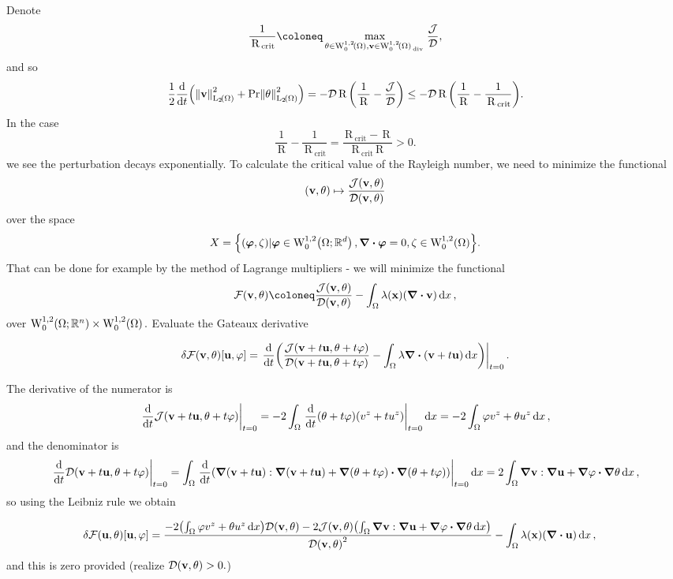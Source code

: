 \documentclass[../main.tex]{subfiles}
\begin{document}
Denote
\[
	\frac{1}{\, \text{R} \,_{\text{crit}}} \coloneq \max_{\theta \in \WkpzeroSet[1][2]{\Omega}, \vb{v} \in \WkpzeroSet[1][2]{\Omega}_{\, \text{div} \,}} \frac{\mathcal{J}}{\mathcal{D}},
\]
and so
\[
	\frac{1}{2}\dv{t}\qty(\norm{\vb{v}}_{\LpSet[2]{\Omega}}^{2} + \Prandtl \norm{\theta}_{\LpSet[2]{\Omega}}^{2}) = - \mathcal{D} \, \text{R} \,\qty(\frac{1}{\, \text{R} \,} - \frac{\mathcal{J}}{\mathcal{D}}) \leq - \mathcal{D} \, \text{R} \,\qty(\frac{1}{\, \text{R} \,}-\frac{1}{\, \text{R} \,_{\text{crit}}}).
\]
In the case
\[
	\frac{1}{\, \text{R} \,}- \frac{1}{\, \text{R} \,_{\text{crit}}} = \frac{\, \text{R} \,_{\text{crit}} - \, \text{R} \,}{\, \text{R} \,_{\text{crit}} \, \text{R} \,} >0.
\]
we see the perturbation decays exponentially.
To calculate the critical value of the Rayleigh number, we need to minimize the functional
\[
	\qty(\vb{v}, \theta) \mapsto \frac{\mathcal{J}\qty(\vb{v},\theta)}{\mathcal{D}\qty(\vb{v},\theta)}
\]
over the space
\[
	X = \qty{(\vb*{\varphi}, \zeta) | \vb*{\varphi} \in \WkpzeroSet[1][2]{\Omega;\R^{d}}, \divergence{\vb*{\varphi}} = 0, \zeta \in \WkpzeroSet[1][2]{\Omega}}.
\]
That can be done for example by the method of Lagrange multipliers - we will minimize the functional
\[
	\mathcal{F}\qty(\vb{v}, \theta) \coloneq \frac{\mathcal{J}\qty(\vb{v}, \theta)}{\mathcal{D}\qty(\vb{v}, \theta)} - \int_{\Omega}\lambda\qty(\vb{x}) \qty(\divergence{\vb{v}})\dd{x},
\]
over $\WkpzeroSet[1][2]{\Omega;\R^{n}} \times \WkpzeroSet[1][2]{\Omega}.$ Evaluate the Gateaux derivative


\[
	\delta \mathcal{F}(\vb{v}, \theta)[\vb{u}, \varphi] =\eval{\dv{t} (\frac{\mathcal{J}(\vb{v}+ t \vb{u}, \theta + t \varphi)}{\mathcal{D}(\vb{v}+t \vb{u}, \theta+t \varphi)} - \int_{\Omega}\lambda \divergence{(\vb{v}+t \vb{u})}\dd{x})}_{t=0}.
\]

The derivative of the numerator is
\[
	\eval{\dv{t}\mathcal{J}\qty(\vb{v}+t \vb{u}, \theta + t \varphi)}_{t=0} = -2 \int_{\Omega}\eval{\dv{t}\qty(\theta + t \varphi)\qty(v^z + t u^z)}_{t=0}\dd{x} = -2 \int_{\Omega} \varphi v^{z} + \theta u^z\dd{x},
\]
and the denominator is
\[
	\eval{\dv{t}\mathcal{D}\qty(\vb{v}+t \vb{u}, \theta + t \varphi)}_{t=0} = \int_{\Omega}\eval{\dv{t}\qty(\grad\qty(\vb{v}+t \vb{u}): \grad\qty(\vb{v}+t \vb{u}) + \grad\qty(\theta + t \varphi)\vdot \grad \qty(\theta + t \varphi))}_{t=0}\dd{x} = 2 \int_{\Omega}\grad \vb{v} : \grad \vb{u} + \grad \varphi \vdot \grad \theta \dd{x},
\]
so using the Leibniz rule we obtain

\begin{align*}
	\delta \mathcal{F}\qty(\vb{u}, \theta)[\vb{u},\varphi] &= \frac{-2\qty(\int_{\Omega}\varphi v^z + \theta u^z\dd{x})\mathcal{D}\qty(\vb{v}, \theta) - 2\mathcal{J}\qty(\vb{v}, \theta)\qty(\int_{\Omega}\grad \vb{v}: \grad \vb{u} + \grad \varphi \vdot \grad \theta\dd{x})}{\mathcal{D}\qty(\vb{v}, \theta)^{2}} - \int_{\Omega}\lambda\qty(\vb{x})\qty(\divergence{\vb{u}})\dd{x},
\end{align*}
and this is zero provided (realize $\mathcal{D}\qty(\vb{v}, \theta) >0.$)
\end{document}
